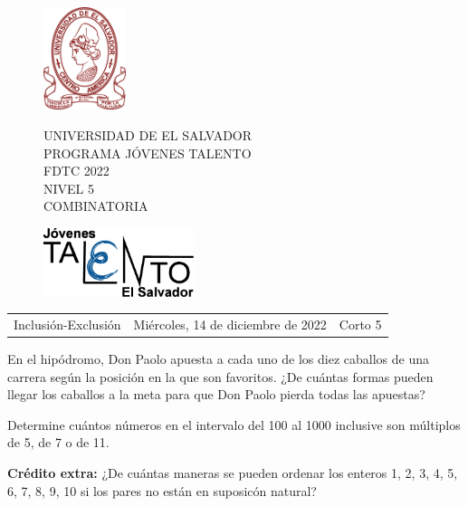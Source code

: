 \documentclass[12pt]{article}
\newcommand{\tema}{Inclusión-Exclusión}
\newcommand{\fecha}{Miércoles, 14 de diciembre de 2022}
\newcommand{\sesion}{Corto 5}
\begin{document}
\thispagestyle{empty}

\begin{figure}[h] 
	\begin{minipage}[b]{0.26\textwidth}
		\begin{center}
			\includegraphics[height=3cm]{Logos/UES.png}
			\par\end{center}
	\end{minipage} 
	\begin{minipage}[b]{0.46\textwidth}
		\begin{center}
			UNIVERSIDAD DE EL SALVADOR\\ [0.1cm]
			PROGRAMA JÓVENES TALENTO\\ [0.1cm]
	        FDTC 2022\\ [0.1cm]
                NIVEL 5\\ [0.1cm]
			COMBINATORIA 
			\par\end{center}
	\end{minipage} 
	\begin{minipage}[b]{0.05\textwidth}
		\begin{center}
			\includegraphics[height=2cm]{Logos/LOGO PJT.png}
			\par\end{center}
	\end{minipage}
\end{figure}

\begin{center}
    \begin{tabular}{p{4.5cm} p{7cm} p{4.5cm}}
        \tema & \centering\fecha & \hfill\sesion
    \end{tabular}
\end{center}

\begin{problema}
    En el hipódromo, Don Paolo apuesta a cada uno de los diez caballos de una carrera según la posición en la que son favoritos. ¿De cuántas formas pueden llegar los caballos a la meta para que Don Paolo pierda todas las apuestas?
\end{problema}

\begin{problema}
    Determine cuántos números en el intervalo del 100 al 1000 inclusive son múltiplos de 5, de 7 o de 11.
\end{problema}

\textbf{Crédito extra:} ¿De cuántas maneras se pueden ordenar los enteros 1, 2, 3, 4, 5, 6, 7, 8, 9, 10 si los pares no están en suposicón natural?
\end{document}
